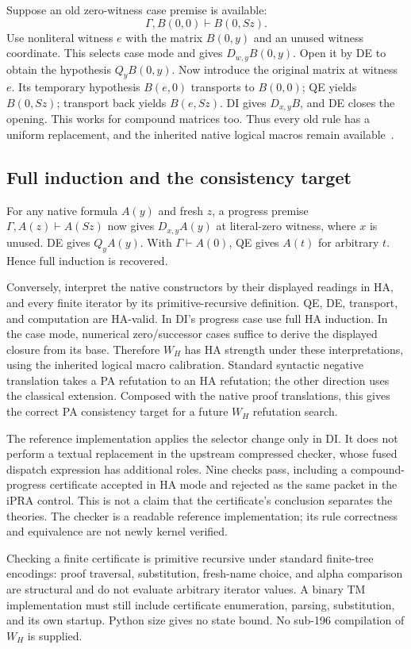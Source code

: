 \documentclass[11pt,letterpaper]{article}
\begin{document}
Suppose an old zero-witness case premise is available:
\[
 \Gamma,B(0,0)\vdash B(0,Sz).
\]
Use nonliteral witness $e$ with the matrix $B(0,y)$ and an unused witness
coordinate. This selects case mode and gives $D_{w,y}B(0,y)$. Open it by DE
to obtain the hypothesis $Q_yB(0,y)$. Now introduce the original matrix
at witness $e$. Its temporary hypothesis $B(e,0)$ transports to $B(0,0)$;
QE yields $B(0,Sz)$; transport back yields $B(e,Sz)$. DI gives
$D_{x,y}B$, and DE closes the opening. This works for compound matrices too.
Thus every old rule has a uniform replacement, and the inherited native
logical macros remain available~\cite{ipra}.

\subsection{Full induction and the consistency target}

For any native formula $A(y)$ and fresh $z$, a progress premise
$\Gamma,A(z)\vdash A(Sz)$ now gives $D_{x,y}A(y)$ at literal-zero witness,
where $x$ is unused. DE gives $Q_yA(y)$. With $\Gamma\vdash A(0)$, QE
gives $A(t)$ for arbitrary $t$. Hence full induction is recovered.

Conversely, interpret the native constructors by their displayed readings
in HA, and every finite iterator by its primitive-recursive definition.
QE, DE, transport, and computation are HA-valid. In DI's progress case
use full HA induction. In the case mode, numerical zero/successor cases
suffice to derive the displayed closure from its base. Therefore $W_H$
has HA strength under these interpretations, using the inherited logical
macro calibration. Standard syntactic negative translation takes a PA
refutation to an HA refutation; the other direction uses the classical
extension. Composed with the native proof translations, this gives the
correct PA consistency target for a future $W_H$ refutation search.

The reference implementation applies the selector change only in DI. It
does not perform a textual replacement in the upstream compressed checker,
whose fused dispatch expression has additional roles. Nine checks pass,
including a compound-progress certificate accepted in HA mode and rejected
as the same packet in the iPRA control. This is not a claim that the
certificate's conclusion separates the theories. The checker is a readable
reference implementation; its rule correctness and equivalence are not
newly kernel verified.

Checking a finite certificate is primitive recursive under standard
finite-tree encodings: proof traversal, substitution, fresh-name choice,
and alpha comparison are structural and do not evaluate arbitrary iterator
values. A binary TM implementation must still include certificate
enumeration, parsing, substitution, and its own startup. Python size gives
no state bound. No sub-196 compilation of $W_H$ is supplied.
\end{document}
